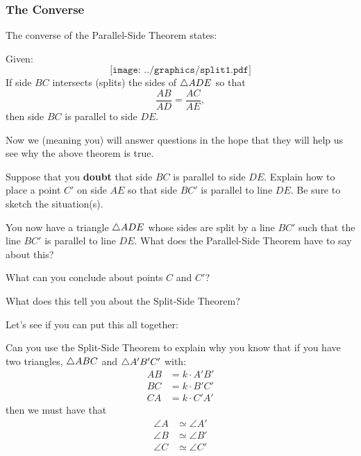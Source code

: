 \subsubsection{The Converse}

The converse of the Parallel-Side Theorem states:

\begin{theorem} 
Given:
\[
\texttt{[image: ../graphics/split1.pdf]}
\]
If side $BC$ intersects (splits) the sides of $\triangle ADE$ so that
\[
\frac{AB}{AD} = \frac{AC}{AE},
\] 
then side $BC$ is parallel to side $DE$.
\end{theorem}


Now we (meaning you) will answer questions in the hope that they will
help us see why the above theorem is true.

\begin{question}
Suppose that you \textbf{doubt} that side $BC$ is parallel to side $DE$. Explain
how to place a point $C'$ on side $AE$ so that side $BC'$ is
parallel to line $DE$. Be sure to sketch the situation(s).
\end{question}
\QM

\begin{question} 
You now have a triangle $\triangle ADE$ whose sides are split by a line
$BC'$ such that the line $BC'$ is parallel to line $DE$. What does the
Parallel-Side Theorem have to say about this?
\end{question}
\QM

\begin{question} What can you conclude about points $C$ and $C'$?
\end{question}
\QM


\begin{question} 
What does this tell you about the Split-Side Theorem?
\end{question}
\QM




Let's see if you can put this all together:
\begin{question}
Can you use the Split-Side Theorem to explain why you know that
if you have two triangles, $\triangle ABC$ and $\triangle A'B'C'$ with:
\begin{align*}
AB &= k\cdot A'B'\\
BC &= k\cdot B'C'\\
CA &= k\cdot C'A'
\end{align*}
then we must have that
\begin{align*}
\angle A &\simeq \angle A'\\
\angle B &\simeq \angle B' \\
\angle C &\simeq \angle C'
\end{align*}
\end{question}
\QM

